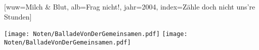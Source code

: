 [wuw={Milch \& Blut}, alb={Frag nicht!}, jahr={2004}, index={Zähle doch nicht uns're Stunden}]




\beginverse
\endverse
\texttt{[image: Noten/BalladeVonDerGemeinsamen.pdf]}
\texttt{[image: Noten/BalladeVonDerGemeinsamen.pdf]}

